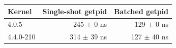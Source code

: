 \begin{tabular}{@{}lrr@{}}
\toprule
Kernel & Single-shot getpid & Batched getpid \\
\midrule
4.0.5 & 245 $\pm$ 0 ns & 129 $\pm$ 0 ns \\
4.4.0-210 & 314 $\pm$ 39 ns & 127 $\pm$ 40 ns \\
\bottomrule
\end{tabular}
